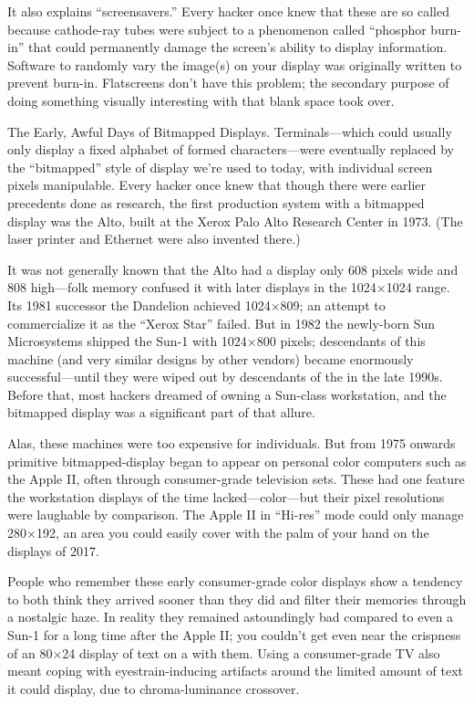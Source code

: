 It also explains ``screensavers.'' Every hacker once knew that these are so
called because cathode-ray tubes were subject to a phenomenon called ``phosphor
burn-in'' that could permanently damage the screen's ability to display
information. Software to randomly vary the image(s) on your display was
originally written to prevent burn-in. Flatscreens don't have this problem; the
secondary purpose of doing something visually interesting with that blank space
took over.

\sect The Early, Awful Days of Bitmapped Displays.
Terminals---which could usually only display a fixed alphabet of formed
characters---were eventually replaced by the ``bitmapped'' style of display we're
used to today, with individual screen pixels manipulable. Every hacker once
knew that though there were earlier precedents done as research, the first
production system with a bitmapped display was the Alto, built at the Xerox
Palo Alto Research Center in 1973. (The laser printer and Ethernet were also
invented there.)

It was not generally known that the Alto had a display only 608 pixels wide and
808 high---folk memory confused it with later displays in the 1024$\times$1024 range.
Its 1981 successor the Dandelion achieved 1024$\times$809; an attempt to commercialize
it as the ``Xerox Star'' failed. But in 1982 the newly-born Sun Microsystems
shipped the Sun-1 with 1024$\times$800 pixels; descendants of this machine (and very
similar designs by other vendors) became enormously successful---until they
were wiped out by descendants of the  in the late 1990s. Before that,
most hackers dreamed of owning a Sun-class workstation, and the bitmapped
display was a significant part of that allure.

Alas, these machines were too expensive for individuals. But from 1975 onwards
primitive bitmapped-display began to appear on personal color computers such as
the Apple II, often through consumer-grade television sets. These had one
feature the workstation displays of the time lacked---color---but their pixel
resolutions were laughable by comparison. The Apple II in ``Hi-res'' mode could
only manage 280$\times$192, an area you could easily cover with the palm of your hand
on the displays of 2017.

People who remember these early consumer-grade color displays show a tendency
to both think they arrived sooner than they did and filter their memories
through a nostalgic haze. In reality they remained astoundingly bad compared to
even a Sun-1 for a long time after the Apple II; you couldn't get even near the
crispness of an 80$\times$24 display of text on a  with them. Using a
consumer-grade TV also meant coping with eyestrain-inducing artifacts around
the limited amount of text it could display, due to  chroma-luminance
crossover.

